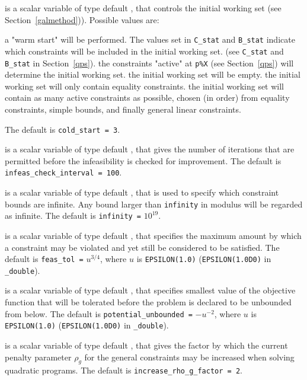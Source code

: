 \begin{description}
 is a scalar variable of type default \integer, that controls
the initial working set (see Section~\ref{galmethod})). Possible values are:
\begin{description}
 a "warm start" will be performed. The values set in
     {\tt C\_stat} and {\tt B\_stat} indicate which
     constraints will be included in the initial working set.
     (see {\tt C\_stat} and {\tt B\_stat} in Section~\ref{qps}).
 the constraints "active" at {\tt p\%X} (see Section~\ref{qps})
     will determine the initial working set.
 the initial working set will be empty.
 the initial working set will only contain equality constraints.
 the initial working set will contain as many active constraints as
     possible, chosen (in order) from equality constraints, simple bounds, and
     finally general linear constraints.
\end{description}
The default is {\tt cold\_start = 3}.

 is a scalar variable of type default \integer,
that gives the number of iterations that are permitted before the
infeasibility is checked for improvement.
The default is {\tt infeas\_check\_interval = 100}.

 is a scalar variable of type default \realdp, that is used to
specify which constraint bounds are infinite.
Any bound larger than {\tt infinity} in modulus will be regarded as infinite.
The default is {\tt infinity =} $10^{19}$.

 is a scalar variable of type default \realdp, that specifies the
maximum amount by which a constraint may be violated and yet still be
considered to be satisfied.
The default is {\tt feas\_tol =} $u^{3/4}$,
where $u$ is {\tt EPSILON(1.0)} ({\tt EPSILON(1.0D0)} in
{\tt \fullpackagename\_dou\-ble}).

  is a scalar variable of type default
\realdp, that specifies smallest
value of the objective function that will be tolerated before the problem
is declared to be unbounded from below.
The default is {\tt potential\_u\-nbounded =} $-u^{-2}$,
where $u$ is {\tt EPSILON(1.0)} ({\tt EPSILON(1.0D0)} in
{\tt \fullpackagename\_double}).

 is a scalar variable of type default \realdp,
that gives the factor by which the current penalty parameter $\rho_g$
for the general constraints may be increased when solving quadratic programs.
The default is {\tt increase\_rho\_g\_factor = 2}.


\end{description}
